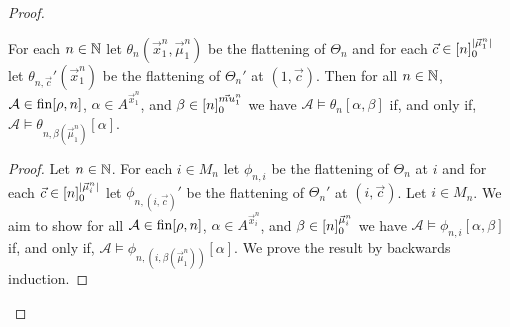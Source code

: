 \documentclass[../main/thesis.tex]{subfiles}
\begin{document}
\begin{proof}




  

  \begin{claim}
    For each $n \in \mathbb{N}$ let $\theta_n(\vec{x}^n_1, \vec{\mu}^n_1)$ be the
    flattening of $\Theta_n$ and for each $\vec{c} \in [n]^{\vert
      \vec{\mu}^n_1\vert}_0$ let $\theta_{n, \vec{c}}'(\vec{x}^n_1)$ be the
    flattening of $\Theta_n'$ at $(1, \vec{c})$. Then for all $n \in \mathbb{N}$,
    $\mathcal{A} \in \text{\upshape fin}{[\rho, n]}$, $\alpha \in A^{\vec{x}^n_1}$, and $\beta
    \in [n]^{\vec{mu}^n_1}_0$ we have $\mathcal{A} \models \theta_n
    [\alpha, \beta]$ if, and only if, $\mathcal{A} \models \theta_{n,
      \beta(\vec{\mu}^n_1)}[\alpha]$.
  \end{claim}
  \begin{proof}
    Let $n \in \mathbb{N}$. For each $i \in M_n$ let $\phi_{n, i}$ be the flattening
    of $\Theta_n$ at $i$ and for each $\vec{c} \in [n]^{\vert
      \vec{\mu}^n_i\vert}_0$ let $\phi_{n, (i, \vec{c})}'$ be the flattening of
    $\Theta_n'$ at $(i, \vec{c})$. Let $i \in M_n$. We aim to show for all
    $\mathcal{A} \in \text{\upshape fin}{[\rho, n]}$, $\alpha \in A^{\vec{x}^n_i}$, and $\beta
    \in [n]^{\vec{\mu}^n_i}_0$ we have $\mathcal{A} \models \phi_{n,
      i}[\alpha, \beta]$ if, and only if, $\mathcal{A} \models \phi_{n, (i,
      \beta(\vec{\mu}^n_1))}[\alpha]$. We prove the result by backwards
    induction.


\end{proof}
\end{proof}
\end{document}
